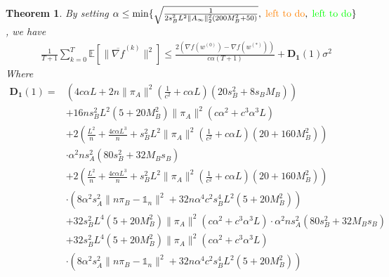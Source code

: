 \documentclass{article}
\newtheorem{theorem}{Theorem}
\newcommand{\EE}[1]{\mathbb{E}\left[#1\right]}
\newcommand{\norm}[1]{\| #1 \|}
\newcommand{\one}{\mathds{1}_n}
\begin{document}
\begin{theorem}
  By setting $\alpha \leq \min\{\sqrt{\frac{1}{2s_B^2L^2\norm{A_{\infty}}_2^2(200M_B^2+50)}},\; \textcolor{orange}{\text{left to do}},\; \textcolor{green}{\text{left to do}}\} $, we have 
  \begin{align*}
    &\frac{1}{T+1}\sum_{k=0}^T\EE{\norm{\overline{\nabla f}^{(k)}}^2} \leq \frac{2(\nabla f(w^{(0)})-\nabla f(w^{(*)}))}{c\alpha(T+1)}+\mathbf{D_1}(1)\sigma^2
  \end{align*}
  Where 
  \begin{align*}
    \mathbf{D_1}(1)=&\left(4c\alpha L+2n\norm{\pi_A}^2\left(\frac{1}{c^2}+c\alpha L\right)(20s_B^2+8s_BM_B)\right)
    \\&+16ns_B^2L^2(5+20M_B^2)\norm{\pi_A}^2\left(c\alpha^2+c^3\alpha^3 L\right)
    \\&+2\left(\frac{L^2}{n}+\frac{4c\alpha L^3}{n}+s_B^2L^2\norm{\pi_A}^2\left(\frac{1}{c^2}+c\alpha L\right)(20+160M_B^2)\right)
    \\&\cdot\alpha^2 n s_A^2(80s_B^2+32M_Bs_B)
    \\&+2\left(\frac{L^2}{n}+\frac{4c\alpha L^3}{n}+s_B^2L^2\norm{\pi_A}^2\left(\frac{1}{c^2}+c\alpha L\right)(20+160M_B^2)\right)
    \\&\cdot \left(8\alpha^2s_A^2\norm{n\pi_B-\one}^2+32n\alpha^4c^2s_B^4L^2(5+20M_B^2)\right)
    \\&+32s_B^2L^4(5+20M_B^2)\norm{\pi_A}^2\left(c\alpha^2+c^3\alpha^3 L\right)\cdot\alpha^2 n s_A^2(80s_B^2+32M_Bs_B)
    \\&+32s_B^2L^4(5+20M_B^2)\norm{\pi_A}^2\left(c\alpha^2+c^3\alpha^3 L\right)
    \\&\cdot \left(8\alpha^2s_A^2\norm{n\pi_B-\one}^2+32n\alpha^4c^2s_B^4L^2(5+20M_B^2)\right)
  \end{align*}
\end{theorem}
\end{document}
